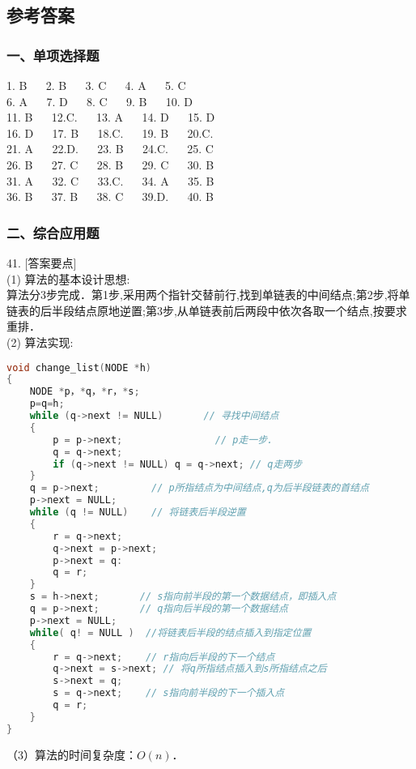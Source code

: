 \subsection{参考答案}

\subsubsection{一、单项选择题}
1. B $\quad$ 2. B $\quad$ 3. C $\quad$ 4. A $\quad$ 5. C \\
6. A $\quad$ 7. D $\quad$ 8. C $\quad$ 9. B $\quad$ 10. D \\
11. B $\quad$ 12.C. $\quad$ 13. A $\quad$ 14. D $\quad$ 15. D \\
16. D $\quad$ 17. B $\quad$ 18.C. $\quad$ 19. B $\quad$ 20.C. \\
21. A $\quad$ 22.D. $\quad$ 23. B $\quad$ 24.C. $\quad$ 25. C \\
26. B $\quad$ 27. C $\quad$ 28. B $\quad$ 29. C $\quad$ 30. B \\
31. A $\quad$ 32. C $\quad$ 33.C. $\quad$ 34. A $\quad$ 35. B \\
36. B $\quad$ 37. B $\quad$ 38. C $\quad$ 39.D. $\quad$ 40. B \\

\subsubsection{二、综合应用题}
41. [答案要点] \\
(1) 算法的基本设计思想: \\
算法分3步完成．第1步,采用两个指针交替前行,找到单链表的中间结点;第2步,将单链表的后半段结点原地逆置;第3步,从单链表前后两段中依次各取一个结点,按要求重排． \\
(2) 算法实现:
\begin{lstlisting}[language=cpp]
void change_list(NODE *h)
{
    NODE *p，*q，*r，*s;
    p=q=h;
    while (q->next != NULL)       // 寻找中间结点
    {
        p = p->next;                // p走一步.
        q = q->next;
        if (q->next != NULL) q = q->next; // q走两步
    }
    q = p->next;         // p所指结点为中间结点,q为后半段链表的首结点
    p->next = NULL;
    while (q != NULL)    // 将链表后半段逆置
    {
        r = q->next;
        q->next = p->next;
        p->next = q:
        q = r;
    }
    s = h->next;       // s指向前半段的第一个数据结点，即插入点
    q = p->next;       // q指向后半段的第一个数据结点
    p->next = NULL;
    while( q! = NULL )  //将链表后半段的结点插入到指定位置
    {
        r = q->next;    // r指向后半段的下一个结点
        q->next = s->next; // 将q所指结点插入到s所指结点之后
        s->next = q;
        s = q->next;    // s指向前半段的下一个插入点
        q = r;
    }
}
\end{lstlisting}
（3）算法的时间复杂度：$O(n)$．

